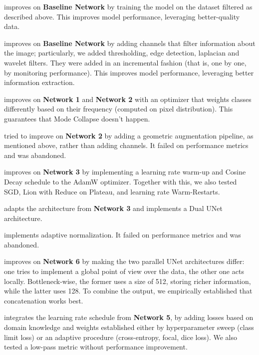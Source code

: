\documentclass[11pt]{template}
\begin{document}
\begin{multicols}{2}
\begin{description}[leftmargin=!]
  \item[\textbf{Network 1}] improves on \textbf{Baseline Network} by training the model on the dataset filtered as described above. This improves model performance, leveraging better-quality data.
  
  \item[\textbf{Network 2}] improves on \textbf{Baseline Network} by adding channels that filter information about the image; particularly, we added thresholding, edge detection, laplacian and wavelet filters. They were added in an incremental fashion (that is, one by one, by monitoring performance). This improves model performance, leveraging better information extraction.
  
  \item[\textbf{Network 3}] improves on \textbf{Network 1} and \textbf{Network 2} with an optimizer that weights classes differently based on their frequency (computed on pixel distribution). This guarantees that Mode Collapse doesn't happen.
  
  \item[\textbf{Network 4}] tried to improve on \textbf{Network 2} by adding a geometric augmentation pipeline, as mentioned above, rather than adding channels. It failed on performance metrics and was abandoned.
  
  \item[\textbf{Network 5}] improves on \textbf{Network 3} by implementing a learning rate warm-up and Cosine Decay schedule to the AdamW optimizer. Together with this, we also tested SGD, Lion with Reduce on Plateau, and learning rate Warm-Restarts.
  
  \item[\textbf{Network 6}] adapts the architecture from \textbf{Network 3} and implements a Dual UNet architecture.
  
  \item[\textbf{Network 7}] implements adaptive normalization. It failed on performance metrics and was abandoned.
  
  \item[\textbf{Network 8}] improves on \textbf{Network 6} by making the two parallel UNet architectures differ: one tries to implement a global point of view over the data, the other one acts locally. Bottleneck-wise, the former uses a size of 512, storing richer information, while the latter uses 128. To combine the output, we empirically established that concatenation works best.
  
  \item[\textbf{Network 9}] integrates the learning rate schedule from \textbf{Network 5}, by adding losses based on domain knowledge and weights established either by hyperparameter sweep (class limit loss) or an adaptive procedure (cross-entropy, focal, dice loss). We also tested a low-pass metric without performance improvement.


\end{description}
\end{multicols}
\end{document}
